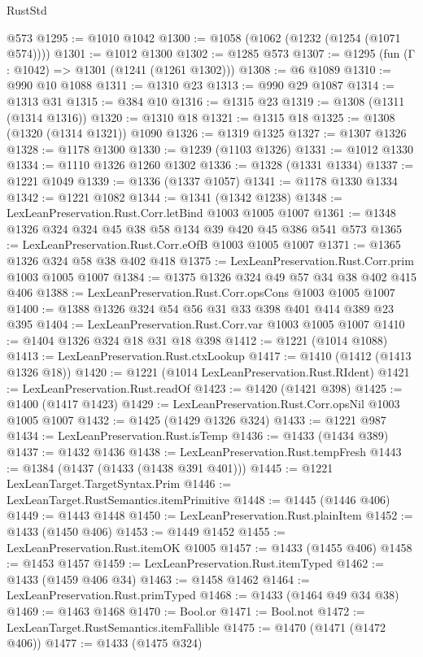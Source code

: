 \begin{lexlean}{RustStd}
\begin{coremodule}
    @573
@1295 := @1010 @1042
@1300 := @1058 (@1062 (@1232 (@1254 (@1071 @574))))
@1301 := @1012 @1300
@1302 := @1285 @573
@1307 := @1295 (fun (Γ : @1042) => @1301 (@1241 (@1261 @1302)))
@1308 := @6 @1089
@1310 := @990 @10 @1088
@1311 := @1310 @23
@1313 := @990 @29 @1087
@1314 := @1313 @31
@1315 := @384 @10
@1316 := @1315 @23
@1319 := @1308 (@1311 (@1314 @1316))
@1320 := @1310 @18
@1321 := @1315 @18
@1325 := @1308 (@1320 (@1314 @1321)) @1090
@1326 := @1319 @1325
@1327 := @1307 @1326
@1328 := @1178 @1300
@1330 := @1239 (@1103 @1326)
@1331 := @1012 @1330
@1334 := @1110 @1326 @1260 @1302
@1336 := @1328 (@1331 @1334)
@1337 := @1221 @1049
@1339 := @1336 (@1337 @1057)
@1341 := @1178 @1330 @1334
@1342 := @1221 @1082
@1344 := @1341 (@1342 @1238)
@1348 := LexLeanPreservation.Rust.Corr.letBind @1003 @1005 @1007
@1361 := @1348 @1326 @324 @324 @45 @38 @58 @134 @39 @420 @45 @386 @541 @573
@1365 := LexLeanPreservation.Rust.Corr.eOfB @1003 @1005 @1007
@1371 := @1365 @1326 @324 @58 @38 @402 @418
@1375 := LexLeanPreservation.Rust.Corr.prim @1003 @1005 @1007
@1384 := @1375 @1326 @324 @49 @57 @34 @38 @402 @415 @406
@1388 := LexLeanPreservation.Rust.Corr.opsCons @1003 @1005 @1007
@1400 := @1388 @1326 @324 @54 @56 @31 @33 @398 @401 @414 @389 @23 @395
@1404 := LexLeanPreservation.Rust.Corr.var @1003 @1005 @1007
@1410 := @1404 @1326 @324 @18 @31 @18 @398
@1412 := @1221 (@1014 @1088)
@1413 := LexLeanPreservation.Rust.ctxLookup
@1417 := @1410 (@1412 (@1413 @1326 @18))
@1420 := @1221 (@1014 LexLeanPreservation.Rust.RIdent)
@1421 := LexLeanPreservation.Rust.readOf
@1423 := @1420 (@1421 @398)
@1425 := @1400 (@1417 @1423)
@1429 := LexLeanPreservation.Rust.Corr.opsNil @1003 @1005 @1007
@1432 := @1425 (@1429 @1326 @324)
@1433 := @1221 @987
@1434 := LexLeanPreservation.Rust.isTemp
@1436 := @1433 (@1434 @389)
@1437 := @1432 @1436
@1438 := LexLeanPreservation.Rust.tempFresh
@1443 := @1384 (@1437 (@1433 (@1438 @391 @401)))
@1445 := @1221 LexLeanTarget.TargetSyntax.Prim
@1446 := LexLeanTarget.RustSemantics.itemPrimitive
@1448 := @1445 (@1446 @406)
@1449 := @1443 @1448
@1450 := LexLeanPreservation.Rust.plainItem
@1452 := @1433 (@1450 @406)
@1453 := @1449 @1452
@1455 := LexLeanPreservation.Rust.itemOK @1005
@1457 := @1433 (@1455 @406)
@1458 := @1453 @1457
@1459 := LexLeanPreservation.Rust.itemTyped
@1462 := @1433 (@1459 @406 @34)
@1463 := @1458 @1462
@1464 := LexLeanPreservation.Rust.primTyped
@1468 := @1433 (@1464 @49 @34 @38)
@1469 := @1463 @1468
@1470 := Bool.or
@1471 := Bool.not
@1472 := LexLeanTarget.RustSemantics.itemFallible
@1475 := @1470 (@1471 (@1472 @406))
@1477 := @1433 (@1475 @324)

\end{coremodule}
\end{lexlean}
